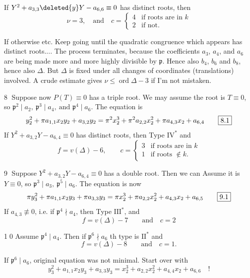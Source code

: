 If $Y^2+a_{3,3}\deleted{y}Y-a_{6,6}\equiv0$ has distinct roots, then
\[
 \nu=3,\quad\text{and}\quad c=\begin{cases}
 4&\text{if roots are in }k\\
 2&\text{if not}.
 \end{cases}
\]

If otherwise  etc. Keep going until the quadratic congruence which appears has distinct roots.... The process terminates, because the coefficients $a_3$, $a_4$, and $a_6$ are being made more and more highly divisible by $\mathfrak p$. Hence also $b_4$, $b_6$ and $b_8$, hence also $\Delta$. But $\Delta$ is fixed under all changes of coordinates (translations) involved. A crude estimate gives $\nu\leq\operatorname{ord}\Delta-3$ if I'm not mistaken.

\textcircled{8} Suppose now $P(T)\equiv0$ has a triple root. We may assume the root is $T\equiv0$, so $\boxed{\mathfrak p^2\mid a_2,\ \mathfrak p^3\mid a_4,\ \text{and }\mathfrak p^4\mid a_6}$. The equation is
\[
 y_2^2+\pi a_{1,1}x_2y_2+a_{3,2}y_2
 =\pi^2x_2^3+\pi^2 a_{2,2}x_2^2+\pi a_{4,3}x_2+a_{6,4}
 \tag*{\fbox{8.1}}
\]
If $Y^2+a_{3,2}Y-a_{6,4}\equiv0$ has distinct roots, then Type $\mathrm{IV}^{*}$ and
\[
 f=v(\Delta)-6,\qquad c=\begin{cases}3&\text{if roots are in }k\\1&\text{if roots }\notin k.\end{cases}
\]

\textcircled{9} Suppose $Y^2+a_{3,2}Y-a_{6,4}\equiv0$ has a double root. Then we can Assume it is $Y\equiv0$, so $\boxed{\mathfrak p^3\mid a_3,\ \mathfrak p^5\mid a_6}$. The equation is now
\[
 \pi y_3^2+\pi a_{1,1}x_2y_3+\pi a_{3,3}y_3
 =\pi x_2^3+\pi a_{2,2}x_2^2+a_{4,3}x_2+a_{6,5}
 \tag*{\fbox{9.1}}
\]
If $a_{4,3}\not\equiv0$, i.e. if $\mathfrak p^4\nmid a_4$, then Type $\mathrm{III}^{*}$, and
\[
 f=v(\Delta)-7\qquad\text{and}\quad c=2
\]

\textcircled{\scriptsize 10} Assume $\boxed{\mathfrak p^4\mid a_4}$. Then if $\mathfrak p^6\nmid a_6$ th type is $\mathrm{II}^{*}$ and
\[
 f=v(\Delta)-8\qquad\text{and}\quad c=1.
\]
\normalmarginpar

If $\mathfrak p^6\mid a_6$, original equation was not minimal. Start over with
\[
 y_3^2+a_{1,1}x_2y_3+a_{3,3}y_3=x_2^3+a_{2,2}x_2^2+a_{4,4}x_2+a_{6,6}\quad!
\]
\endgroup

